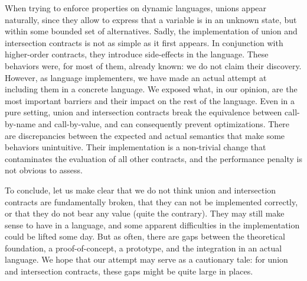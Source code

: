 \documentclass[sigplan,10pt,review,anonymous]{acmart}
\begin{document}


When trying to enforce properties on dynamic languages, unions appear naturally,
since they allow to express that a variable is in an unknown state, but within
some bounded set of alternatives.  Sadly, the implementation of union and
intersection contracts is not as simple as it first appears. In conjunction with
higher-order contracts, they introduce side-effects in the language. These
behaviors were, for most of them, already known: we do not claim their
discovery. However, as language implementers, we have made an actual attempt at
including them in a concrete language. We exposed what, in our opinion, are the
most important barriers and their impact on the rest of the language. Even in a
pure setting, union and intersection contracts break the equivalence between
call-by-name and call-by-value, and can consequently prevent optimizations.
There are discrepancies between the expected and actual semantics that make some
behaviors unintuitive. Their implementation is a non-trivial change that
contaminates the evaluation of all other contracts, and the performance penalty
is not obvious to assess.

To conclude, let us make clear that we do not think union and intersection
contracts are fundamentally broken, that they can not be implemented correctly,
or that they do not bear any value (quite the contrary). They may still make
sense to have in a language, and some apparent difficulties in the
implementation could be lifted some day. But as often, there are gaps between
the theoretical foundation, a proof-of-concept, a prototype, and the integration
in an actual language. We hope that our attempt may serve as a cautionary tale:
for union and intersection contracts, these gaps might be quite large in places.


\end{document}
